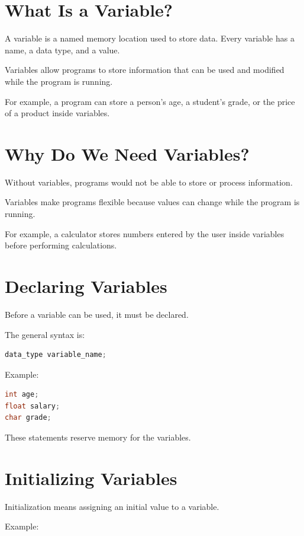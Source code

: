 \documentclass[12pt,openany]{book}
\begin{document}
\section{What Is a Variable?}

A variable is a named memory location used to store data. Every variable has a name, a data type, and a value.

Variables allow programs to store information that can be used and modified while the program is running.

For example, a program can store a person's age, a student's grade, or the price of a product inside variables.

\section{Why Do We Need Variables?}

Without variables, programs would not be able to store or process information.

Variables make programs flexible because values can change while the program is running.

For example, a calculator stores numbers entered by the user inside variables before performing calculations.

\section{Declaring Variables}

Before a variable can be used, it must be declared.

The general syntax is:

\begin{lstlisting}[language=C]
data_type variable_name;
\end{lstlisting}

Example:

\begin{lstlisting}[language=C]
int age;
float salary;
char grade;
\end{lstlisting}

These statements reserve memory for the variables.

\section{Initializing Variables}

Initialization means assigning an initial value to a variable.

Example:
\end{document}
